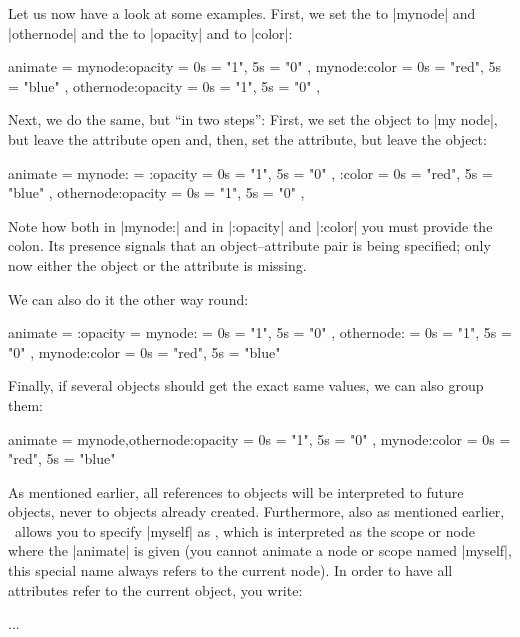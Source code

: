Let us now have a look at some examples. First, we set the 
to |mynode| and |othernode| and the  to |opacity| and to
|color|:
%
\begin{codeexample}
animate = {
  mynode:opacity    = { 0s = "1",   5s = "0" },
  mynode:color      = { 0s = "red", 5s = "blue" },
  othernode:opacity = { 0s = "1",   5s = "0" },
}
\end{codeexample}

Next, we do the same, but ``in two steps'': First, we set the object to
|my node|, but leave the attribute open and, then, set the attribute, but leave
the object:
%
\begin{codeexample}
animate = {
  mynode: = {
    :opacity        = { 0s = "1",   5s = "0" },
    :color          = { 0s = "red", 5s = "blue" }
  },
  othernode:opacity = { 0s = "1",   5s = "0" },
}
\end{codeexample}
%
Note how both in  |mynode:| and in |:opacity| and |:color| you must provide the
colon. Its presence signals that an object--attribute pair is being specified;
only now either the object or the attribute is missing.

We can also do it the other way round:
%
\begin{codeexample}
animate = {
  :opacity = {
    mynode:         = { 0s = "1",   5s = "0" },
    othernode:      = { 0s = "1",   5s = "0" }
  },
  mynode:color      = { 0s = "red", 5s = "blue" }
}
\end{codeexample}
%
Finally, if several objects should get the exact same values, we can also group
them:
%
\begin{codeexample}
animate = {
  {mynode,othernode}:opacity = { 0s = "1",   5s = "0" },
  mynode:color               = { 0s = "red", 5s = "blue" }
}
\end{codeexample}

As mentioned earlier, all references to objects will be interpreted to future
objects, never to objects already created. Furthermore, also as mentioned
earlier, \tikzname\ allows you to specify |myself| as , which is
interpreted as the scope or node where the |animate| is given (you cannot
animate a node or scope named |myself|, this special name always refers to the
current node). In order to have all attributes refer to the current object, you
write:
%
\begin{codeexample}
\begin{scope} [animate = {
                 myself: = { %
                   :opacity = { ... },
                   :xshift  = { ... }
                 }
               }]
  ...
\end{scope}
\end{codeexample}

